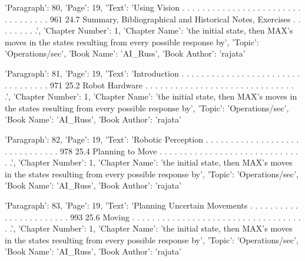 {'Paragraph': 80, 'Page': 19, 'Text': 'Using Vision . . . . . . . . . . . . . . . . . . . . . . . . . . . . . . . . . 961 24.7 Summary, Bibliographical and Historical Notes, Exercises . . . . . . . . .', 'Chapter Number': 1, 'Chapter Name': 'the initial state, then MAX’s moves in the states resulting from every possible response by', 'Topic': 'Operations/sec', 'Book Name': 'AI_Russ', 'Book Author': 'rajata'}

{'Paragraph': 81, 'Page': 19, 'Text': 'Introduction . . . . . . . . . . . . . . . . . . . . . . . . . . . . . . . . . 971 25.2 Robot Hardware . . . . . . . . . . . . . . . . . . . . . . . . . . . . . . .', 'Chapter Number': 1, 'Chapter Name': 'the initial state, then MAX’s moves in the states resulting from every possible response by', 'Topic': 'Operations/sec', 'Book Name': 'AI_Russ', 'Book Author': 'rajata'}

{'Paragraph': 82, 'Page': 19, 'Text': 'Robotic Perception . . . . . . . . . . . . . . . . . . . . . . . . . . . . . . 978 25.4 Planning to Move . . . . . . . . . . . . . . . . . . . . . . . . . . . . . .', 'Chapter Number': 1, 'Chapter Name': 'the initial state, then MAX’s moves in the states resulting from every possible response by', 'Topic': 'Operations/sec', 'Book Name': 'AI_Russ', 'Book Author': 'rajata'}

{'Paragraph': 83, 'Page': 19, 'Text': 'Planning Uncertain Movements . . . . . . . . . . . . . . . . . . . . . . . 993 25.6 Moving . . . . . . . . . . . . . . . . . . . . . . . . . . . . . . . . . . . .', 'Chapter Number': 1, 'Chapter Name': 'the initial state, then MAX’s moves in the states resulting from every possible response by', 'Topic': 'Operations/sec', 'Book Name': 'AI_Russ', 'Book Author': 'rajata'}

